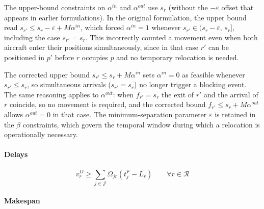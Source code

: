 


\begin{remark}
The upper-bound constraints on $\alpha^{in}$ and $\alpha^{out}$ use $s_r$ (without the $-\varepsilon$ offset that appears in earlier formulations).
In the original formulation, the upper bound read $s_{r'} \le s_r - \varepsilon + M\alpha^{in}$, which forced $\alpha^{in}=1$ whenever $s_{r'} \in (s_r-\varepsilon,\, s_r]$, including the case $s_{r'} = s_r$.
This incorrectly counted a movement even when both aircraft enter their positions simultaneously, since in that case $r'$ can be positioned in $p'$ before $r$ occupies $p$ and no temporary relocation is needed.

The corrected upper bound $s_{r'} \le s_r + M\alpha^{in}$ sets $\alpha^{in}=0$ as feasible whenever $s_{r'} \le s_r$, so simultaneous arrivals ($s_{r'} = s_r$) no longer trigger a blocking event.
The same reasoning applies to $\alpha^{out}$: when $f_{r'} = s_r$ the exit of $r'$ and the arrival of $r$ coincide, so no movement is required, and the corrected bound $f_{r'} \le s_r + M\alpha^{out}$ allows $\alpha^{out}=0$ in that case.
The minimum-separation parameter $\varepsilon$ is retained in the $\beta$ constraints, which govern the temporal window during which a relocation is operationally necessary.
\end{remark}

\paragraph{Delays}

\begin{equation}
v^{D}_r \ge
\sum_{j \in \mathcal{J}} \Omega_{jr}(t^{F}_j - L_r)
\qquad \forall r \in \mathcal{R}
\end{equation}


\paragraph{Makespan}

